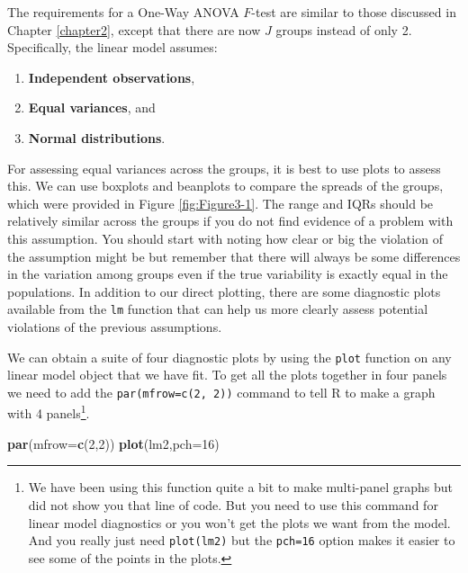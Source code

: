 \documentclass[]{book}
\newenvironment{Shaded}{\begin{snugshade}}{\end{snugshade}}
\newcommand{\KeywordTok}[1]{\textcolor[rgb]{0.13,0.29,0.53}{\textbf{#1}}}
\newcommand{\DataTypeTok}[1]{\textcolor[rgb]{0.13,0.29,0.53}{#1}}
\newcommand{\DecValTok}[1]{\textcolor[rgb]{0.00,0.00,0.81}{#1}}
\newcommand{\NormalTok}[1]{#1}
\let\rmarkdownfootnote\footnote%
\def\footnote{\protect\rmarkdownfootnote}
\begin{document}
The requirements for a One-Way ANOVA \(F\)-test are similar to those
discussed in Chapter \ref{chapter2}, except that there are now \(J\)
groups instead of only 2. Specifically, the linear model assumes:

\begin{enumerate}
\def\labelenumi{\arabic{enumi}.}
\item
  \textbf{Independent observations},
\item
  \textbf{Equal variances}, and
\item
  \textbf{Normal distributions}.
\end{enumerate}

For assessing equal variances across the groups, it is best to use plots
to assess this. We can use boxplots and beanplots to compare the spreads
of the groups, which were provided in Figure \ref{fig:Figure3-1}. The
range and IQRs should be relatively similar across the groups if you do
not find evidence of a problem with this assumption. You should start
with noting how clear or big the violation of the assumption might be
but remember that there will always be some differences in the variation
among groups even if the true variability is exactly equal in the
populations. In addition to our direct plotting, there are some
diagnostic plots available from the \texttt{lm} function that can help
us more clearly assess potential violations of the previous assumptions.

We can obtain a suite of four diagnostic plots by using the
\texttt{plot} function on any linear model object that we have fit. To
get all the plots together in four panels we need to add the
\texttt{par(mfrow=c(2,\ 2))} command to tell R to make a graph with 4
panels\footnote{We have been using this function quite a bit to make
  multi-panel graphs but did not show you that line of code. But you
  need to use this command for linear model diagnostics or you won't get
  the plots we want from the model. And you really just need
  \texttt{plot(lm2)} but the \texttt{pch=16} option makes it easier to
  see some of the points in the plots.}.

\begin{Shaded}
\begin{Highlighting}[]
\KeywordTok{par}\NormalTok{(}\DataTypeTok{mfrow=}\KeywordTok{c}\NormalTok{(}\DecValTok{2}\NormalTok{,}\DecValTok{2}\NormalTok{))}
\KeywordTok{plot}\NormalTok{(lm2,}\DataTypeTok{pch=}\DecValTok{16}\NormalTok{)}
\end{Highlighting}
\end{Shaded}
\end{document}
